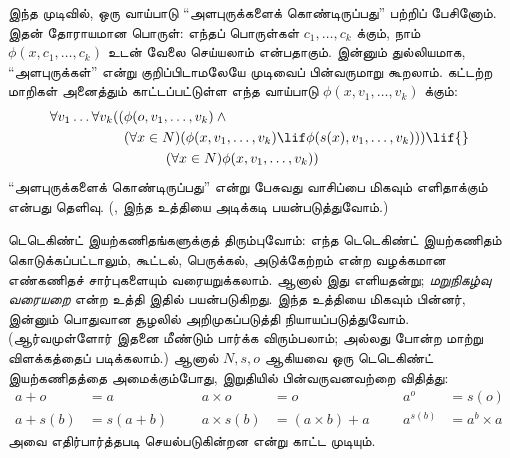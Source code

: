 \documentclass[../../../include/open-logic-section]{subfiles}
\begin{document}
இந்த முடிவில், ஒரு வாய்பாடு ``அளபுருக்களைக் கொண்டிருப்பது'' பற்றிப்
பேசினோம். இதன் தோராயமான பொருள்: எந்தப் பொருள்கள்
$c_1, \ldots, c_k$ க்கும், நாம் $\phi(x, c_1, \ldots, c_k)$ உடன்
வேலை செய்யலாம் என்பதாகும். இன்னும் துல்லியமாக, ``அளபுருக்கள்'' என்று
குறிப்பிடாமலேயே முடிவைப் பின்வருமாறு கூறலாம். கட்டற்ற மாறிகள் அனைத்தும்
காட்டப்பட்டுள்ள எந்த வாய்பாடு $\phi(x, v_1, \ldots, v_k)$ க்கும்:
	\begin{align*}
			\forall v_1 \ldots \forall v_k((&\phi(o, v_1,\ldots, v_k) \land {}\\
			&	(\forall x \in N)(\phi(x,v_1, \ldots, v_k) \lif \phi(s(x), v_1,\ldots, v_k))) \lif {}\\
			&\hspace{3em} (\forall x \in N)\phi(x, v_1,\ldots, v_k))
	\end{align*}
``அளபுருக்களைக் கொண்டிருப்பது'' என்று பேசுவது வாசிப்பை மிகவும்
எளிதாக்கும் என்பது தெளிவு.
(, இந்த உத்தியை அடிக்கடி
பயன்படுத்துவோம்.)

டெடெகிண்ட் இயற்கணிதங்களுக்குத் திரும்புவோம்: எந்த டெடெகிண்ட்
இயற்கணிதம் கொடுக்கப்பட்டாலும், கூட்டல், பெருக்கல், அடுக்கேற்றம் என்ற
வழக்கமான எண்கணிதச் சார்புகளையும் வரையறுக்கலாம். ஆனால் இது
எளியதன்று; \emph{மறுநிகழ்வு வரையறை} என்ற உத்தி இதில் பயன்படுகிறது.
இந்த உத்தியை மிகவும் பின்னர், இன்னும் பொதுவான சூழலில் அறிமுகப்படுத்தி
நியாயப்படுத்துவோம். (ஆர்வமுள்ளோர்
இதனை மீண்டும் பார்க்க விரும்பலாம்; அல்லது
\citealt[pp.~95--8]{Potter2004} போன்ற மாற்று விளக்கத்தைப் படிக்கலாம்.)
ஆனால் $N, s, o$ ஆகியவை ஒரு டெடெகிண்ட் இயற்கணிதத்தை அமைக்கும்போது,
இறுதியில் பின்வருவனவற்றை விதித்து:
\begin{align*}
	{a} + {o} &= {a} & & & {a} \times {o} &= {o} & & & {a}^{o} &= s(o)\\
{a} + {s}({b}) &= {s}({a}+{b}) &&& {a} \times {s}({b}) &= ({a}\times {b}) + {a}  & & & {a}^{{s}({b})} &= {a}^{b} \times {a}
\end{align*}
அவை எதிர்பார்த்தபடி செயல்படுகின்றன என்று காட்ட முடியும்.
\end{document}
